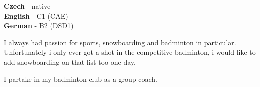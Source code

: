 \documentclass[9pt]{developercv} %
\begin{document}
\begin{minipage}[t]{0.3\textwidth}
	\vspace{-\baselineskip} %

	
	\textbf{Czech} - native\\
	\textbf{English} - C1 (CAE)\\
	\textbf{German} - B2 (DSD1)
\end{minipage}
\hfill
\begin{minipage}[t]{0.3\textwidth}
	\vspace{-\baselineskip} %
	
	
	I always had passion for sports, snowboarding and badminton in particular. Unfortunately i only ever got a shot in the competitive badminton, i would like to add snowboarding on that list too one day.
\end{minipage}
\hfill
\begin{minipage}[t]{0.3\textwidth}
	\vspace{-\baselineskip} %
	
	
	I partake in my badminton club as a group coach.
\end{minipage}

\end{document}
